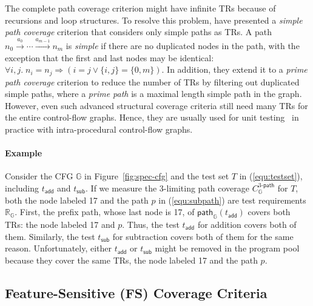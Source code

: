 \documentclass[acmsmall,review,screen]{acmart}
\newcommand{\name}[1]{\textsf{#1}}
\newcommand{\graph}{\mathbb{G}}
\newcommand{\node}{n}
\newcommand{\edge}[1]{\xrightarrow{#1}}
\newcommand{\annot}{a}
\newcommand{\pat}{p}
\newcommand{\patmap}[1]{\name{path}_{#1}}
\newcommand{\test}{t}
\newcommand{\addtest}{\test_\name{add}}
\newcommand{\subtest}{\test_\name{sub}}
\newcommand{\trset}[1]{\mathbb{R}_{#1}}
\newcommand{\cov}[1]{C_{#1}}
\newcommand{\kpathcov}[2]{\cov{#2}^{{#1}\name{-path}}}
\begin{document}

The complete path coverage criterion might have infinite TRs because of
recursions and loop structures.
%
To resolve this problem, \citet{cov-def} have presented a \textit{simple path
coverage} criterion that considers only simple paths as TRs.
%
A path $\node_0 \edge{\annot_0} \cdots \edge{\annot_{m-1}} \node_m$ is
\textit{simple} if there are no duplicated nodes in the path, with the exception that the
first and last nodes may be identical: $\forall i, j. \; \node_i = \node_j
\Rightarrow (i = j \vee \{ i, j \} = \{ 0, m \})$.
%
In addition, they extend it to a \textit{prime path coverage} criterion to
reduce the number of TRs by filtering out duplicated simple paths, where a
\textit{prime path} is a maximal length simple path in the graph.
%
However, even such advanced structural coverage criteria still need many
TRs for the entire control-flow graphs.
%
Hence, they are usually used for unit testing~\cite{unit-test} in practice
with intra-procedural control-flow graphs.


\paragraph{\textbf{Example}}
%
Consider the CFG $\graph$ in Figure~\ref{fig:spec-cfg} and the test
set $T$ in (\ref{equ:testset}), including $\addtest$ and $\subtest$.
%
If we measure the 3-limiting path coverage $\kpathcov{3}{\graph}$ for
$T$, both the node labeled 17 and the path $\pat$ in (\ref{equ:subpath}) are
test requirements $\trset{\graph}$.
%
First, the prefix path, whose last node is 17, of $\patmap{\graph}(\addtest)$
covers both TRs: the node labeled 17 and $\pat$.
%
Thus, the test $\addtest$ for addition covers both of them.
%
Similarly, the test $\subtest$ for subtraction covers both of them for the same
reason.
%
Unfortunately, either $\addtest$ or $\subtest$ might be removed in the program
pool because they cover the same TRs, the node labeled 17 and the path $\pat$.




\subsection{Feature-Sensitive (FS) Coverage Criteria}\label{sec:fs-cov}
\end{document}
